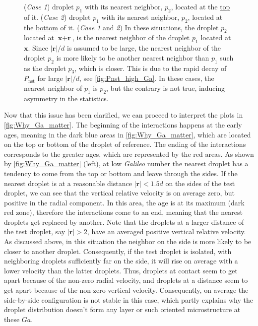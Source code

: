 \begin{figure}[h!]
{        (\textit{Case 1}) droplet $p_1$ with  its nearest neighbor, $p_2$, located at the \underline{top} of it. 
        (\textit{Case 2}) droplet $p_1$ with  its nearest neighbor, $p_2$, located at the \underline{bottom} of it. 
        (\textit{Case 1} and \textit{2})
        In these situations, the droplet $p_2$ located at $\textbf{x} + \textbf{r}$, is the nearest neighbor of the droplet $p_1$ located at $\textbf{x}$. 
        Since $|\textbf{r}|/d$ is assumed to be large, the nearest neighbor of the droplet $p_2$ is more likely to be another nearest neighbor than $p_1$ such as the droplet $p_3$, which is closer.
        This is due to the rapid decay of $P_\text{nst}$ for large $|\textbf{r}|/d$, see \ref{fig:Pnst_high_Ga}. 
        In these cases, the nearest neighbor of $p_1$ is $p_2$, but the contrary is not true, inducing asymmetry in the statistics.  
    }
    \label{fig:diagram_asym}
\end{figure}

Now that this issue has been clarified, we can proceed to interpret the plots in \ref{fig:Why_Ga_matter}.
The beginning of the interactions happens at the early ages, meaning in the dark blue areas in  \ref{fig:Why_Ga_matter}, which are located on the top or bottom of the droplet of reference.
The ending of the interactions corresponds to the greater ages, which are represented by the red areas. 
As shown by \ref{fig:Why_Ga_matter} (left), at low \textit{Galileo} number the nearest droplet has a tendency to come from the top or bottom and leave through the sides. 
If the nearest droplet is at a reasonable distance $|\textbf{r}| < 1.5d$ on the sides of the test droplet, we can see that the vertical relative velocity is on average zero, but positive in the radial component.
In this area, the age is at its maximum (dark red zone), therefore the interactions come to an end, meaning that the nearest droplets get replaced by another. 
Note that the droplets at a larger distance of the test droplet, say $|\textbf{r}|>2$, have an averaged positive vertical relative velocity. 
As discussed above, in this situation the neighbor on the side is more likely to be closer to another droplet. 
Consequently, if the test droplet is isolated, with neighboring droplets sufficiently far on the side, it will rise on average with a lower velocity than the latter droplets.
Thus, droplets at contact seem to get apart because of the non-zero radial velocity, and droplets at a distance seem to get apart because of the non-zero vertical velocity.  
Consequently, on average the side-by-side configuration is not stable in this case, which partly explains why the droplet distribution doesn't form any layer or such oriented microstructure at these $Ga$.   

